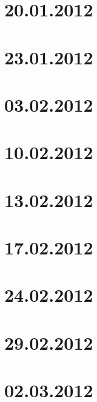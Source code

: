 \section{20.01.2012}



\section{23.01.2012}



\section{03.02.2012}



\section{10.02.2012}



\section{13.02.2012}



\section{17.02.2012}



\section{24.02.2012}



\section{29.02.2012}



\section{02.03.2012}

